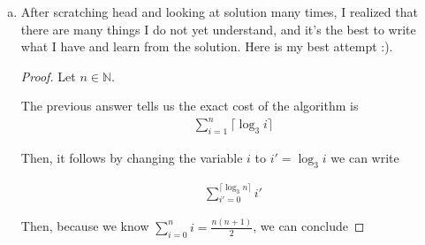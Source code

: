 \documentclass[12pt]{article}
\begin{document}
\begin{enumerate}[a.]
\begin{proof}
        \begin{align}
            \lceil \log_3 i \rceil
        \end{align}

        iterations.

        \bigskip

        Next, we need to determine the total number of iterations of loop 2
        over all iterations of loop 1.

        \bigskip

        The code tells us loop 1 starts at $i = 1$ and ends at $i = n$ with each
        $i$ increasing by 1 per iteration.

        \bigskip

        Using these facts, we can conclude loop 2 has total of

        \begin{align}
            \lceil \log_3 1 \rceil + \lceil \log_3 2 \rceil + \cdots + \lceil \log_3 n \rceil &= \sum\limits_{i=1}^n \lceil \log_3 i \rceil
        \end{align}

        iterations.
    \end{proof}

    \item
    After scratching head and looking at solution many times, I realized that there
    are many things I do not yet understand, and it's the best to write what I have
    and learn from the solution. Here is my best attempt :).

    \begin{proof}
        Let $n \in \mathbb{N}$.

        \bigskip

        The previous answer tells us the exact cost of the algorithm is
        \setcounter{equation}{0}
        \begin{align}
            \sum\limits_{i=1}^n \lceil \log_3 i \rceil
        \end{align}

        Then, it follows by changing the variable $i$ to $i' = \log_3 i$ we can write

        \begin{align}
            \sum\limits_{i'=0}^{\lceil \log_3 n \rceil} i'
        \end{align}

        \bigskip

        Then, because we know $\sum\limits_{i=0}^n i = \frac{n(n+1)}{2}$, we can
        conclude


\end{proof}
\end{enumerate}
\end{document}
